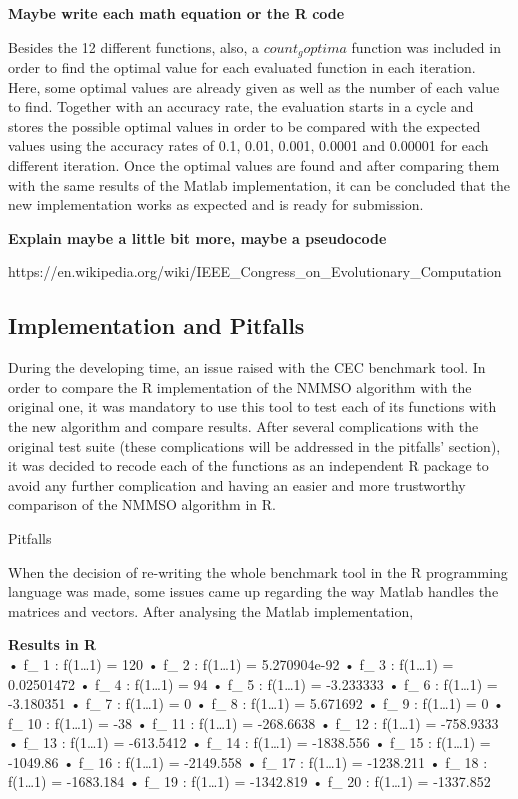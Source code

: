 \documentclass[12pt,a4paper]{article}
\begin{document}
\textbf{Maybe write each math equation or the R code}

Besides the 12 different functions, also, a \(count_goptima\) function
was included in order to find the optimal value for each evaluated
function in each iteration. Here, some optimal values are already given
as well as the number of each value to find. Together with an accuracy
rate, the evaluation starts in a cycle and stores the possible optimal
values in order to be compared with the expected values using the
accuracy rates of 0.1, 0.01, 0.001, 0.0001 and 0.00001 for each
different iteration. Once the optimal values are found and after
comparing them with the same results of the Matlab implementation, it
can be concluded that the new implementation works as expected and is
ready for submission.

\textbf{Explain maybe a little bit more, maybe a pseudocode}

https://en.wikipedia.org/wiki/IEEE\_Congress\_on\_Evolutionary\_Computation

\subsection{Implementation and
Pitfalls}\label{implementation-and-pitfalls}

During the developing time, an issue raised with the CEC benchmark tool.
In order to compare the R implementation of the NMMSO algorithm with the
original one, it was mandatory to use this tool to test each of its
functions with the new algorithm and compare results. After several
complications with the original test suite (these complications will be
addressed in the pitfalls' section), it was decided to recode each of
the functions as an independent R package to avoid any further
complication and having an easier and more trustworthy comparison of the
NMMSO algorithm in R.

Pitfalls

When the decision of re-writing the whole benchmark tool in the R
programming language was made, some issues came up regarding the way
Matlab handles the matrices and vectors. After analysing the Matlab
implementation,

\textbf{Results in R}\\
 • f\_ 1 : f(1\ldots{}1) = 120 • f\_ 2 : f(1\ldots{}1) = 5.270904e-92 •
f\_ 3 : f(1\ldots{}1) = 0.02501472 • f\_ 4 : f(1\ldots{}1) = 94 • f\_ 5
: f(1\ldots{}1) = -3.233333 • f\_ 6 : f(1\ldots{}1) = -3.180351 • f\_ 7
: f(1\ldots{}1) = 0 • f\_ 8 : f(1\ldots{}1) = 5.671692 • f\_ 9 :
f(1\ldots{}1) = 0 • f\_ 10 : f(1\ldots{}1) = -38 • f\_ 11 :
f(1\ldots{}1) = -268.6638 • f\_ 12 : f(1\ldots{}1) = -758.9333 • f\_ 13
: f(1\ldots{}1) = -613.5412 • f\_ 14 : f(1\ldots{}1) = -1838.556 • f\_
15 : f(1\ldots{}1) = -1049.86 • f\_ 16 : f(1\ldots{}1) = -2149.558 • f\_
17 : f(1\ldots{}1) = -1238.211 • f\_ 18 : f(1\ldots{}1) = -1683.184 •
f\_ 19 : f(1\ldots{}1) = -1342.819 • f\_ 20 : f(1\ldots{}1) = -1337.852
\end{document}
